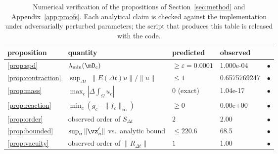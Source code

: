 \begin{table}[t]
\centering
\small
\caption{Numerical verification of the propositions of Section~\ref{sec:method} and Appendix~\ref{app:proofs}. Each analytical claim is checked against the implementation under adversarially perturbed parameters; the script that produces this table is released with the code.}
\label{tab:theory}
\begin{tabular}{llllc}
\toprule
proposition & quantity & predicted & observed & \\
\midrule
\ref{prop:spd} & $\lambda_{\min}(\mD_c)$ & $\ge \varepsilon = 0.0001$ & 1.000e-04 & $\bullet$ \\
\ref{prop:contraction} & $\sup_{\Delta t}\;\|E(\Delta t)u\|/\|u\|$ & $\le 1$ & 0.6575769247 & $\bullet$ \\
\ref{prop:mass} & $\max_c |\Delta \int_\Omega u_c|$ & $0$ (exact) & 1.04e-17 & $\bullet$ \\
\ref{prop:reaction} & $\min_c (g_c - \|f_c\|_\infty)$ & $\ge 0$ & 0.00e+00 & $\bullet$ \\
\ref{prop:order} & observed order of $S_{\Delta t}$ & $2$ & 2.00 & $\bullet$ \\
\ref{prop:bounded} & $\sup_n \|\vz_n'\|$ vs.\ analytic bound & $\le 220.6$ & 68.5 & $\bullet$ \\
\ref{prop:vacuity} & observed order of $\|R_{\Delta t}\|$ & $1$ & 1.00 & $\bullet$ \\
\bottomrule
\end{tabular}
\end{table}
